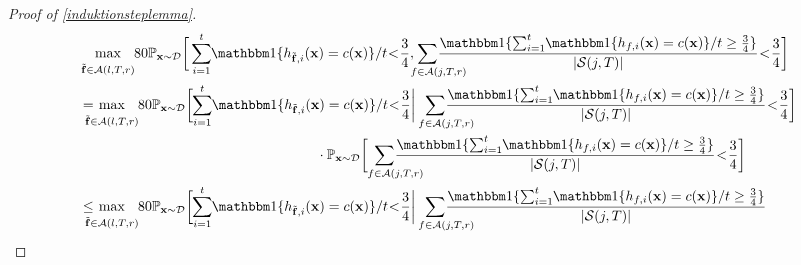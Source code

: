 \begin{proof}[Proof of \cref{induktionsteplemma}]
  \begin{align}\label{highprobabilityeq6}
    &\max_{\stackrel{}{\rf\in\cA(l,T,r)}} \negmedspace 80\p_{\rx\sim \cD}
  \bigg[ \sum_{i=1}^{t}\negmedspace  \ind\{h_{\rf,i}(\rx)=c(\rx)\}/t\negmedspace <\negmedspace \frac{3}{4},
  \negmedspace \negmedspace  \negmedspace  \negmedspace \negmedspace  \negmedspace \negmedspace \negmedspace \negmedspace\sum_{\text{\quad\quad}f\in \cA(j,T,r)} \negmedspace \negmedspace \negmedspace \negmedspace\negmedspace \negmedspace  \negmedspace \negmedspace \negmedspace \negmedspace \frac{\ind\{\sum_{i=1}^{t}\negmedspace  \ind\{h_{f,i}(\rx)=c(\rx)\}/t\geq \frac{3}{4}\}}{|\cS(j,T)|}
  \negmedspace<\negmedspace\frac{3}{4}\bigg]
      \\  
      &=\negmedspace\negmedspace\negmedspace\negmedspace\max_{\stackrel{}{\rf\in\cA(l,T,r)}} \negmedspace  80\p_{\rx\sim \cD}
      \bigg[
        \negmedspace \sum_{i=1}^{t}\negmedspace  \ind\{h_{\rf,i}(\rx)=c(\rx)\}/t\negmedspace <\negmedspace \frac{3}{4}\bigg |
       \negmedspace  \negmedspace \negmedspace  \negmedspace \negmedspace \negmedspace \negmedspace\sum_{\text{\quad\quad}f\in \cA(j,T,r)} \negmedspace \negmedspace \negmedspace \negmedspace\negmedspace \negmedspace  \negmedspace \negmedspace \negmedspace \negmedspace \frac{\ind\{\sum_{i=1}^{t}\negmedspace  \ind\{h_{f,i}(\rx)=c(\rx)\}/t\geq \frac{3}{4}\}}{|\cS(j,T)|}
       \negmedspace<\negmedspace\frac{3}{4}\bigg]
      \nonumber\\ 
      &\quad\quad\quad\quad\quad\quad\quad\quad\quad\quad\quad\qquad\qquad\qquad\cdot \p_{\rx\sim \cD}\bigg[ \negmedspace \negmedspace\negmedspace \negmedspace \negmedspace\negmedspace \negmedspace \negmedspace\sum_{\text{\quad\quad}f\in \cA(j,T,r)} \negmedspace \negmedspace \negmedspace \negmedspace\negmedspace \negmedspace  \negmedspace \negmedspace \negmedspace \negmedspace \frac{\ind\{\sum_{i=1}^{t}\negmedspace  \ind\{h_{f,i}(\rx)=c(\rx)\}/t\geq \frac{3}{4}\}}{|\cS(j,T)|}\negmedspace<\negmedspace\frac{3}{4}\bigg]
      \nonumber\\
      &\leq \negmedspace\negmedspace\negmedspace\negmedspace
      \max_{\stackrel{}{\rf\in\cA(l,T,r)}} \negmedspace  80\p_{\rx\sim \cD}
      \bigg[
        \negmedspace \sum_{i=1}^{t}\negmedspace  \ind\{h_{\rf,i}(\rx)=c(\rx)\}/t\negmedspace <\negmedspace \frac{3}{4}\bigg |
       \negmedspace  \negmedspace \negmedspace  \negmedspace \negmedspace \negmedspace \negmedspace\sum_{\text{\quad\quad}f\in \cA(j,T,r)} \negmedspace \negmedspace \negmedspace \negmedspace\negmedspace \negmedspace  \negmedspace \negmedspace \negmedspace \negmedspace \frac{\ind\{\sum_{i=1}^{t}\negmedspace  \ind\{h_{f,i}(\rx)=c(\rx)\}/t\geq \frac{3}{4}\}}{|\cS(j,T)|}

\end{align}
\end{proof}
